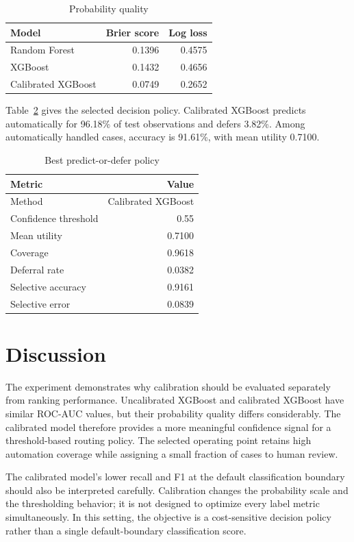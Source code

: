 \documentclass[conference]{IEEEtran}
\begin{document}
\begin{table}[t]
\caption{Probability quality}
\label{tab:probability}
\centering
\footnotesize
\begin{tabular}{lrr}
\toprule
Model & Brier score & Log loss \\
\midrule
Random Forest & 0.1396 & 0.4575 \\
XGBoost & 0.1432 & 0.4656 \\
Calibrated XGBoost & 0.0749 & 0.2652 \\
\bottomrule
\end{tabular}
\end{table}

Table~\ref{tab:policy} gives the selected decision policy. Calibrated XGBoost predicts automatically for 96.18\% of test observations and defers 3.82\%. Among automatically handled cases, accuracy is 91.61\%, with mean utility 0.7100.

\begin{table}[t]
\caption{Best predict-or-defer policy}
\label{tab:policy}
\centering
\footnotesize
\begin{tabular}{lr}
\toprule
Metric & Value \\
\midrule
Method & Calibrated XGBoost \\
Confidence threshold & 0.55 \\
Mean utility & 0.7100 \\
Coverage & 0.9618 \\
Deferral rate & 0.0382 \\
Selective accuracy & 0.9161 \\
Selective error & 0.0839 \\
\bottomrule
\end{tabular}
\end{table}

\section{Discussion}
The experiment demonstrates why calibration should be evaluated separately from ranking performance. Uncalibrated XGBoost and calibrated XGBoost have similar ROC-AUC values, but their probability quality differs considerably. The calibrated model therefore provides a more meaningful confidence signal for a threshold-based routing policy. The selected operating point retains high automation coverage while assigning a small fraction of cases to human review.

The calibrated model's lower recall and F1 at the default classification boundary should also be interpreted carefully. Calibration changes the probability scale and the thresholding behavior; it is not designed to optimize every label metric simultaneously. In this setting, the objective is a cost-sensitive decision policy rather than a single default-boundary classification score.
\end{document}
